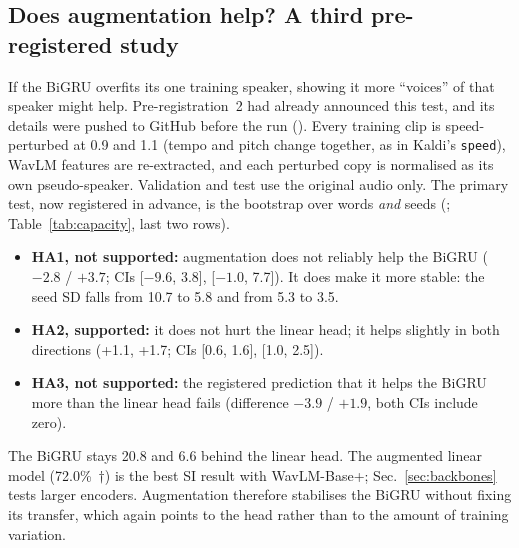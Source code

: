 \subsection{Does augmentation help? A third pre-registered study}\label{sec:augment}
If the BiGRU overfits its one training speaker, showing it more ``voices'' of that speaker might help.
Pre-registration~2 had already announced this test, and its details were pushed to GitHub before the run ().
Every training clip is speed-perturbed at 0.9 and 1.1 (tempo and pitch change together, as in Kaldi's \texttt{speed}), WavLM features are re-extracted, and each perturbed copy is normalised as its own pseudo-speaker. Validation and test use the original audio only.
The primary test, now registered in advance, is the bootstrap over words \emph{and} seeds (; Table~\ref{tab:capacity}, last two rows).
\begin{itemize}\setlength\itemsep{1pt}
\item \textbf{HA1, not supported:} augmentation does not reliably help the BiGRU ($-2.8$ / $+3.7$\pp; CIs [$-9.6$, 3.8], [$-1.0$, 7.7]). It does make it more stable: the seed SD falls from 10.7 to 5.8 and from 5.3 to 3.5\pp.
\item \textbf{HA2, supported:} it does not hurt the linear head; it helps slightly in both directions (+1.1, +1.7\pp; CIs [0.6, 1.6], [1.0, 2.5]).
\item \textbf{HA3, not supported:} the registered prediction that it helps the BiGRU more than the linear head fails (difference $-3.9$ / $+1.9$\pp, both CIs include zero).
\end{itemize}
The BiGRU stays 20.8 and 6.6\pp{} behind the linear head. The augmented linear model (72.0\%~$\dagger$) is the best SI result with WavLM-Base+; Sec.~\ref{sec:backbones} tests larger encoders. Augmentation therefore stabilises the BiGRU without fixing its transfer, which again points to the head rather than to the amount of training variation.

